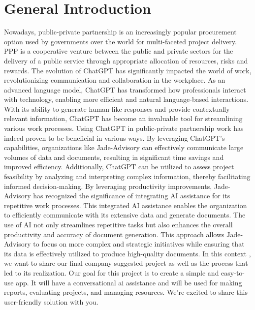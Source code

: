 \chapter*{General Introduction}

Nowadays, public-private partnership is an increasingly popular procurement option used by governments over the world for multi-faceted project delivery. PPP is a cooperative venture between the public and private sectors for the delivery of a public service through appropriate allocation of resources, risks and rewards.
\vskip 0.5cm
The evolution of ChatGPT has significantly impacted the world of work, revolutionizing communication and collaboration in the workplace. As an advanced language model, ChatGPT has transformed how professionals interact with technology, enabling more efficient and natural language-based interactions. With its ability to generate human-like responses and provide contextually relevant information, ChatGPT has become an invaluable tool for streamlining various work processes.
\vskip 0.5cm
Using ChatGPT in public-private partnership work has indeed proven to be beneficial in various ways. By leveraging ChatGPT's capabilities, organizations like Jade-Advisory can effectively communicate large volumes of data and documents, resulting in significant time savings and improved efficiency. Additionally, ChatGPT can be utilized to assess project feasibility by analyzing and interpreting complex information, thereby facilitating informed decision-making.
\vskip 0.5cm
By leveraging productivity improvements, Jade-Advisory has recognized the significance of integrating AI assistance for its repetitive work processes. This integrated AI assistance enables the organization to efficiently communicate with its extensive data and generate documents. The use of AI not only streamlines repetitive tasks but also enhances the overall productivity and accuracy of document generation. This approach allows Jade-Advisory to focus on more complex and strategic initiatives while ensuring that its data is effectively utilized to produce high-quality documents.
\vskip 0.5cm
In this context , we want to share our final company-suggested project as well as the process that led to its realization. Our goal for this project is to create a simple and easy-to-use app. It will have a conversational ai assistance and will be used for making reports, evaluating projects, and managing resources. We're excited to share this user-friendly solution with you.


